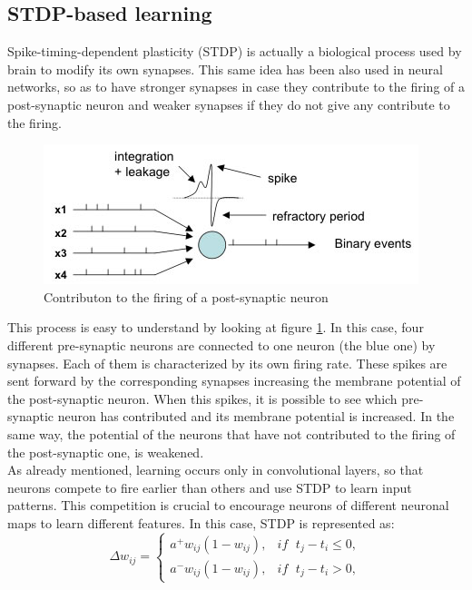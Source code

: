 \documentclass[11pt,a4paper]{scrartcl}
\begin{document}
\subsection{STDP-based learning}

Spike-timing-dependent plasticity (STDP) is actually a biological process used by brain to modify its own synapses. This same idea has been also used in neural networks, so as to have stronger synapses in case they contribute to the firing of a post-synaptic neuron and weaker synapses if they do not give any contribute to the firing.\\
\begin{figure}[h]
	\centering
	\includegraphics[width=0.75\linewidth]{images/spikes}
	\caption{Contributon to the firing of a post-synaptic neuron}
	\label{fig:spikes}
\end{figure}
This process is easy to understand by looking at figure \ref{fig:spikes}. In this case, four different pre-synaptic neurons are connected to one neuron (the blue one) by synapses. Each of them is characterized by its own firing rate. These spikes are sent forward by the corresponding synapses increasing the membrane potential of the post-synaptic neuron. When this spikes, it is possible to see which pre-synaptic neuron has contributed and its membrane potential is increased. In the same way, the potential of the neurons that have not contributed to the firing of the post-synaptic one, is weakened.\\
As already mentioned, learning occurs only in convolutional layers, so that neurons compete to fire earlier than others and use STDP to learn input patterns. This competition is crucial to encourage neurons of different neuronal maps to learn different features. In this case, STDP is represented as:
\begin{equation*}
	\Delta w_{ij} = \begin{cases}
		a^{+}w_{ij}(1-w_{ij}), & \textit{if }\; t_{j}-t_{i} \leq 0,\\
		a^{-}w_{ij}(1-w_{ij}), & \textit{if }\; t_{j}-t_{i} > 0,
	\end{cases}
\end{equation*}
\end{document}
